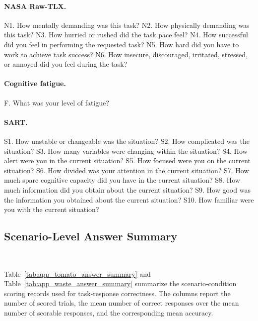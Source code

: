 \paragraph{NASA Raw-TLX.}
N1. How mentally demanding was this task?
N2. How physically demanding was this task?
N3. How hurried or rushed did the task pace feel?
N4. How successful did you feel in performing the requested task?
N5. How hard did you have to work to achieve task success?
N6. How insecure, discouraged, irritated, stressed, or annoyed did you feel during the task?

\paragraph{Cognitive fatigue.}
F. What was your level of fatigue?

\paragraph{SART.}
S1. How unstable or changeable was the situation?
S2. How complicated was the situation?
S3. How many variables were changing within the situation?
S4. How alert were you in the current situation?
S5. How focused were you on the current situation?
S6. How divided was your attention in the current situation?
S7. How much spare cognitive capacity did you have in the current situation?
S8. How much information did you obtain about the current situation?
S9. How good was the information you obtained about the current situation?
S10. How familiar were you with the current situation?

\subsection{Scenario-Level Answer Summary}~\label{appx:user_answer_summary}

Table~\ref{tab:app_tomato_answer_summary} and Table~\ref{tab:app_waste_answer_summary} summarize the scenario-condition scoring records used for task-response correctness. The columns report the number of scored trials, the mean number of correct responses over the mean number of scorable responses, and the corresponding mean accuracy.

